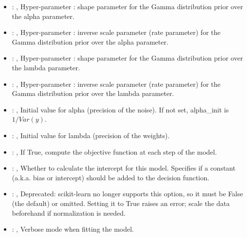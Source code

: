 \begin{itemize}
    \item {}: ,
      Hyper-parameter : shape parameter for the Gamma
      distribution prior over the alpha parameter.

    \item {}: ,
      Hyper-parameter : inverse scale parameter (rate parameter)
      for the Gamma distribution prior over the alpha parameter.

    \item {}: ,
      Hyper-parameter : shape parameter for the Gamma distribution
      prior over the lambda parameter.

    \item {}: ,
      Hyper-parameter : inverse scale parameter (rate parameter) for
      the Gamma distribution prior over the lambda parameter.

    \item {}: ,
      Initial value for alpha (precision of the noise).
      If not set, alpha\_init is $1/Var(y)$.

    \item {}: ,
      Initial value for lambda (precision of the weights).

    \item {}: ,
      If True, compute the objective function at each step of the
      model.

    \item {}: ,
      Whether to calculate the intercept for this model. Specifies if a constant (a.k.a. bias or
      intercept)                                                   should be added to the decision
      function.

    \item {}: ,
      Deprecated: scikit-learn no longer supports this option, so it must be False (the default) or
      omitted.                                                  Setting it to True raises an error;
      scale the data beforehand if normalization is needed.

    \item {}: ,
      Verbose mode when fitting the model.
  \end{itemize}


